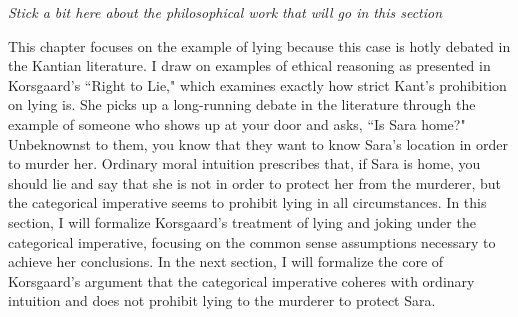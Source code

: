 \begin{isabellebody}
\begin{isamarkuptext}
\emph{Stick a bit here about the philosophical work that will go in this section}%
\end{isamarkuptext}\isamarkuptrue%
%
\isadelimdocument
%
\endisadelimdocument
%
\isatagdocument
%
\isamarkuptrue%
%
\endisatagdocument
{\isafolddocument}%
%
\isadelimdocument
%
\endisadelimdocument
%
\begin{isamarkuptext}%
This chapter focuses on the example of lying because this case is hotly debated in the Kantian
literature. I draw on examples of ethical reasoning as presented in Korsgaard's ``Right to Lie," which 
examines exactly how strict Kant's prohibition on lying is. She picks up a long-running debate in the 
literature through the example of someone who shows up at your door and asks, ``Is Sara home?" Unbeknownst to them, 
you know that they want to know Sara's location in order to murder her. Ordinary moral intuition 
prescribes that, if Sara is home, you should lie and say that she is not in order to 
protect her from the murderer, but the categorical imperative seems to prohibit lying in all 
circumstances. In this section, I will formalize Korsgaard's treatment of lying and joking under the 
categorical imperative, focusing on the common sense assumptions necessary to achieve her conclusions. 
In the next section, I will formalize the core of Korsgaard's argument that the categorical imperative
coheres with ordinary intuition and does not prohibit lying to the murderer to protect Sara.


\end{isamarkuptext}
\end{isabellebody}
